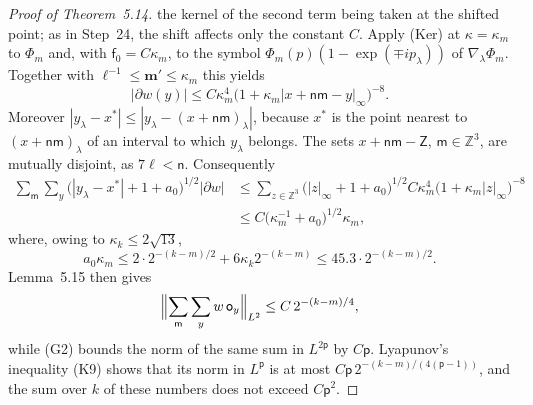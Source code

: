 \documentclass[11pt]{amsart}
\theoremstyle{definition}
\begin{document}
\begin{proof}[Proof of Theorem~5.14]
the kernel of the second term being taken at the shifted point; as in Step~24, the shift affects only the constant $C$.
Apply (Ker) at $\kappa=\kappa_m$ to $\Phi_m$ and, with $\mathsf f_0=C\kappa_m$, to the symbol $\Phi_m(p)(1-\exp(\mp ip_\lambda))$ of $\nabla_\lambda\Phi_m$.
Together with $\ell^{-1}\le\mathbf m'\le\kappa_m$ this yields
\begin{equation*}
|\partial w(y)|\le C\kappa_m^4\bigl(1+\kappa_m|x+\mathsf n\mathsf m-y|_\infty\bigr)^{-8}.
\end{equation*}
Moreover $|y_\lambda-x^*|\le|y_\lambda-(x+\mathsf n\mathsf m)_\lambda|$, because $x^*$ is the point nearest to $(x+\mathsf n\mathsf m)_\lambda$ of an interval to which $y_\lambda$ belongs.
The sets $x+\mathsf n\mathsf m-\mathsf Z$, $\mathsf m\in\mathbb Z^3$, are mutually disjoint, as $7\ell<\mathsf n$.
Consequently
\begin{equation*}
\begin{split}
\sum_{\mathsf m}\sum_y\bigl(|y_\lambda-x^*|+1+a_0\bigr)^{1/2}|\partial w|&\le\sum_{z\in\mathbb Z^3}\bigl(|z|_\infty+1+a_0\bigr)^{1/2}C\kappa_m^4\bigl(1+\kappa_m|z|_\infty\bigr)^{-8}\\
&\le C\bigl(\kappa_m^{-1}+a_0\bigr)^{1/2}\kappa_m,
\end{split}
\end{equation*}
where, owing to $\kappa_k\le2\sqrt{13}$,
\begin{equation*}
a_0\kappa_m\le2\cdot2^{-(k-m)/2}+6\kappa_k2^{-(k-m)}\le45.3\cdot2^{-(k-m)/2}.
\end{equation*}
Lemma~5.15 then gives
\begin{equation*}
\Bigl\|\sum_{\mathsf m}\sum_yw\,\mathsf o_y\Bigr\|_{L^2}\le C\,2^{-(k-m)/4},
\end{equation*}
while (G2) bounds the norm of the same sum in $L^{2\mathsf p}$ by $C\mathsf p$.
Lyapunov's inequality (K9) shows that its norm in $L^{\mathsf p}$ is at most $C\mathsf p\,2^{-(k-m)/(4(\mathsf p-1))}$, and the sum over $k$ of these numbers does not exceed $C\mathsf p^2$.


\end{proof}
\end{document}
